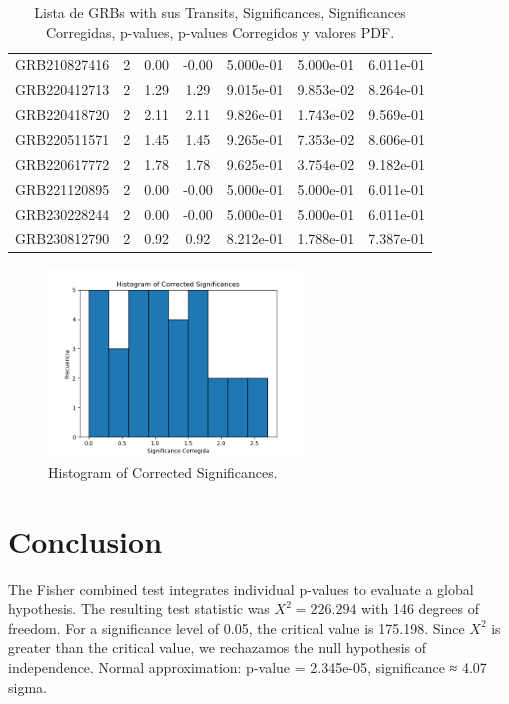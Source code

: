 \documentclass[12pt]{article}
\begin{document}
\begin{table}[h!]
{\begin{tabular}{l c c c c c c}
GRB210827416 & 2 & 0.00 & -0.00 & 5.000e-01 & 5.000e-01 & 6.011e-01 \\
GRB220412713 & 2 & 1.29 & 1.29 & 9.015e-01 & 9.853e-02 & 8.264e-01 \\
GRB220418720 & 2 & 2.11 & 2.11 & 9.826e-01 & 1.743e-02 & 9.569e-01 \\
GRB220511571 & 2 & 1.45 & 1.45 & 9.265e-01 & 7.353e-02 & 8.606e-01 \\
GRB220617772 & 2 & 1.78 & 1.78 & 9.625e-01 & 3.754e-02 & 9.182e-01 \\
GRB221120895 & 2 & 0.00 & -0.00 & 5.000e-01 & 5.000e-01 & 6.011e-01 \\
GRB230228244 & 2 & 0.00 & -0.00 & 5.000e-01 & 5.000e-01 & 6.011e-01 \\
GRB230812790 & 2 & 0.92 & 0.92 & 8.212e-01 & 1.788e-01 & 7.387e-01 \\
\bottomrule
\end{tabular}%
}
\caption{Lista de GRBs with sus Transits, Significances, Significances Corregidas, p-values, p-values Corregidos y valores PDF.}
\end{table}

\begin{figure}[h!]
\centering
\includegraphics[width=0.6\textwidth]{corrected_significance_hist.png}
\caption{Histogram of Corrected Significances.}
\end{figure}

\section*{Conclusion}
The Fisher combined test integrates individual p-values to evaluate a global hypothesis.
The resulting test statistic was $X^2 = 226.294$ with 146 degrees of freedom.
For a significance level of 0.05, the critical value is 175.198.
Since $X^2$ is greater than the critical value, we rechazamos the null hypothesis of independence.
Normal approximation: p-value = 2.345e-05, significance ≈ 4.07 sigma.
\end{document}
